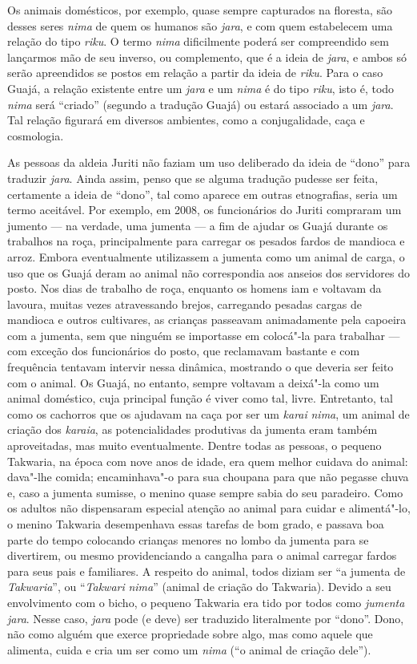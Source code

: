 Os animais domésticos, por exemplo, quase sempre capturados na floresta,
são desses seres \emph{nima} de quem os humanos são \emph{jara}, e com
quem estabelecem uma relação do tipo \emph{riku}. O termo \emph{nima}
dificilmente poderá ser compreendido sem lançarmos mão de seu inverso,
ou complemento, que é a ideia de \emph{jara}, e ambos só serão
apreendidos se postos em relação a partir da ideia de \emph{riku}. Para
o caso Guajá, a relação existente entre um \emph{jara} e um \emph{nima}
é do tipo \emph{riku}, isto é, todo \emph{nima} será ``criado'' (segundo a
tradução Guajá) ou estará associado a um \emph{jara}. Tal relação
figurará em diversos ambientes, como a conjugalidade, caça e cosmologia.

As pessoas da aldeia Juriti não faziam um uso deliberado da ideia de
``dono'' para traduzir \emph{jara}. Ainda assim, penso que se alguma
tradução pudesse ser feita, certamente a ideia de ``dono'', tal como
aparece em outras etnografias, seria um termo aceitável. Por exemplo, em
2008, os funcionários do  Juriti compraram um jumento --- na verdade,
uma jumenta --- a fim de ajudar os Guajá durante os trabalhos na roça,
principalmente para carregar os pesados fardos de mandioca e arroz.
Embora eventualmente utilizassem a jumenta como um animal de carga, o
uso que os Guajá deram ao animal não correspondia aos anseios dos
servidores do posto. Nos dias de trabalho de roça, enquanto os homens
iam e voltavam da lavoura, muitas vezes atravessando brejos, carregando
pesadas cargas de mandioca e outros cultivares, as crianças passeavam
animadamente pela capoeira com a jumenta, sem que ninguém se importasse
em colocá"-la para trabalhar --- com exceção dos funcionários do posto, que
reclamavam bastante e com frequência tentavam intervir nessa dinâmica,
mostrando o que deveria ser feito com o animal. Os Guajá, no entanto,
sempre voltavam a deixá"-la como um animal doméstico, cuja principal
função é viver como tal, livre. Entretanto, tal como os cachorros que os
ajudavam na caça por ser um \emph{karai} \emph{nima}, um animal de
criação dos \emph{karaia}, as potencialidades produtivas da jumenta eram
também aproveitadas, mas muito eventualmente. Dentre todas as pessoas, o
pequeno Takwaria, na época com nove anos de idade, era quem melhor
cuidava do animal: dava"-lhe comida; encaminhava"-o para sua choupana para
que não pegasse chuva e, caso a jumenta sumisse, o menino quase sempre
sabia do seu paradeiro. Como os adultos não dispensaram especial atenção
ao animal para cuidar e alimentá"-lo, o menino Takwaria desempenhava
essas tarefas de bom grado, e passava boa parte do tempo colocando
crianças menores no lombo da jumenta para se divertirem, ou mesmo
providenciando a cangalha para o animal carregar fardos para seus pais e
familiares. A respeito do animal, todos diziam ser ``a jumenta de
\emph{Takwaria}'', ou ``\emph{Takwari} \emph{nima}'' (animal de criação do
Takwaria). Devido a seu envolvimento com o bicho, o pequeno Takwaria era
tido por todos como \emph{jumenta} \emph{jara}. Nesse caso, \emph{jara}
pode (e deve) ser traduzido literalmente por ``dono''. Dono, não como
alguém que exerce propriedade sobre algo, mas como aquele que alimenta,
cuida e cria um ser como um \emph{nima} (``o animal de criação dele'').

